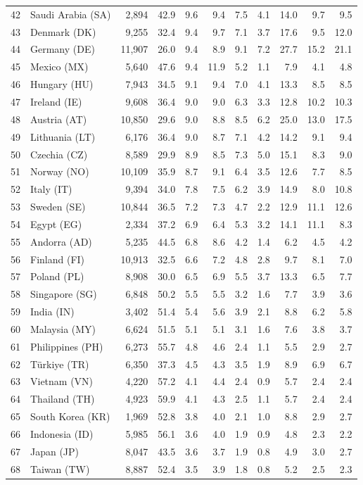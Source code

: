 \documentclass[10pt,a4paper,twocolumn]{article}
\begin{document}
\begin{tabular}{@{}rlrrrrrrrrr@{}}
42 & Saudi Arabia (SA) & 2,894 & 42.9 & 9.6 & 9.4 & 7.5 & 4.1 & 14.0 & 9.7 & 9.5 \\
43 & Denmark (DK) & 9,255 & 32.4 & 9.4 & 9.7 & 7.1 & 3.7 & 17.6 & 9.5 & 12.0 \\
44 & Germany (DE) & 11,907 & 26.0 & 9.4 & 8.9 & 9.1 & 7.2 & 27.7 & 15.2 & 21.1 \\
45 & Mexico (MX) & 5,640 & 47.6 & 9.4 & 11.9 & 5.2 & 1.1 & 7.9 & 4.1 & 4.8 \\
46 & Hungary (HU) & 7,943 & 34.5 & 9.1 & 9.4 & 7.0 & 4.1 & 13.3 & 8.5 & 8.5 \\
47 & Ireland (IE) & 9,608 & 36.4 & 9.0 & 9.0 & 6.3 & 3.3 & 12.8 & 10.2 & 10.3 \\
48 & Austria (AT) & 10,850 & 29.6 & 9.0 & 8.8 & 8.5 & 6.2 & 25.0 & 13.0 & 17.5 \\
49 & Lithuania (LT) & 6,176 & 36.4 & 9.0 & 8.7 & 7.1 & 4.2 & 14.2 & 9.1 & 9.4 \\
50 & Czechia (CZ) & 8,589 & 29.9 & 8.9 & 8.5 & 7.3 & 5.0 & 15.1 & 8.3 & 9.0 \\
51 & Norway (NO) & 10,109 & 35.9 & 8.7 & 9.1 & 6.4 & 3.5 & 12.6 & 7.7 & 8.5 \\
52 & Italy (IT) & 9,394 & 34.0 & 7.8 & 7.5 & 6.2 & 3.9 & 14.9 & 8.0 & 10.8 \\
53 & Sweden (SE) & 10,844 & 36.5 & 7.2 & 7.3 & 4.7 & 2.2 & 12.9 & 11.1 & 12.6 \\
54 & Egypt (EG) & 2,334 & 37.2 & 6.9 & 6.4 & 5.3 & 3.2 & 14.1 & 11.1 & 8.3 \\
55 & Andorra (AD) & 5,235 & 44.5 & 6.8 & 8.6 & 4.2 & 1.4 & 6.2 & 4.5 & 4.2 \\
56 & Finland (FI) & 10,913 & 32.5 & 6.6 & 7.2 & 4.8 & 2.8 & 9.7 & 8.1 & 7.0 \\
57 & Poland (PL) & 8,908 & 30.0 & 6.5 & 6.9 & 5.5 & 3.7 & 13.3 & 6.5 & 7.7 \\
58 & Singapore (SG) & 6,848 & 50.2 & 5.5 & 5.5 & 3.2 & 1.6 & 7.7 & 3.9 & 3.6 \\
59 & India (IN) & 3,402 & 51.4 & 5.4 & 5.6 & 3.9 & 2.1 & 8.8 & 6.2 & 5.8 \\
60 & Malaysia (MY) & 6,624 & 51.5 & 5.1 & 5.1 & 3.1 & 1.6 & 7.6 & 3.8 & 3.7 \\
61 & Philippines (PH) & 6,273 & 55.7 & 4.8 & 4.6 & 2.4 & 1.1 & 5.5 & 2.9 & 2.7 \\
62 & Türkiye (TR) & 6,350 & 37.3 & 4.5 & 4.3 & 3.5 & 1.9 & 8.9 & 6.9 & 6.7 \\
63 & Vietnam (VN) & 4,220 & 57.2 & 4.1 & 4.4 & 2.4 & 0.9 & 5.7 & 2.4 & 2.4 \\
64 & Thailand (TH) & 4,923 & 59.9 & 4.1 & 4.3 & 2.5 & 1.1 & 5.7 & 2.4 & 2.4 \\
65 & South Korea (KR) & 1,969 & 52.8 & 3.8 & 4.0 & 2.1 & 1.0 & 8.8 & 2.9 & 2.7 \\
66 & Indonesia (ID) & 5,985 & 56.1 & 3.6 & 4.0 & 1.9 & 0.9 & 4.8 & 2.3 & 2.2 \\
67 & Japan (JP) & 8,047 & 43.5 & 3.6 & 3.7 & 1.9 & 0.8 & 4.9 & 3.0 & 2.7 \\
68 & Taiwan (TW) & 8,887 & 52.4 & 3.5 & 3.9 & 1.8 & 0.8 & 5.2 & 2.5 & 2.3 \\
\bottomrule
\end{tabular}
\end{document}
